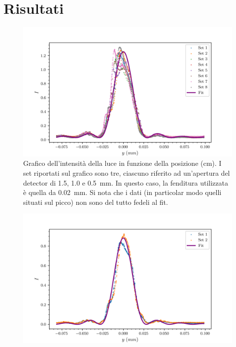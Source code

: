 \documentclass[../main.tex]{subfiles}
\begin{document}
\section{Risultati}


\begin{figure}[ht!]
    \includegraphics{../graphs/fit_0.02_1.5.png}
    \caption{Grafico dell’intensità della luce in funzione della posizione (cm). I set riportati sul grafico sono tre, ciascuno riferito ad un’apertura del detector di \num{1.5}, \num{1.0} e \qty{0.5}{\milli\meter}. In questo caso, la fenditura utilizzata è quella da \qty{0.02}{\milli\meter}. Si nota che i dati (in particolar modo quelli situati sul picco) non sono del tutto fedeli al fit.}
    \label{fig:fit_0.02_1.5}
\end{figure}

\begin{figure}[ht!]
    \includegraphics{../graphs/fit_0.02_1.0.png}
    \caption{}
    \label{fig:fit_0.02_1.0}
\end{figure}
\end{document}
